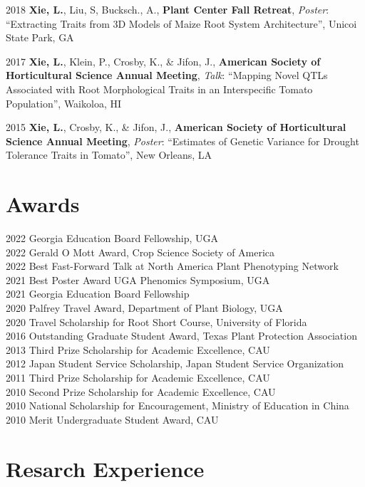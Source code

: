 \documentclass[11pt,a4paper,]{awesome-cv}
\begin{document}
2018 \textbf{Xie, L.}, Liu, S, Bucksch., A., \textbf{Plant Center Fall
Retreat}, \emph{Poster}: ``Extracting Traits from 3D Models of Maize
Root System Architecture'', Unicoi State Park, GA

2017 \textbf{Xie, L.}, Klein, P., Crosby, K., \& Jifon, J.,
\textbf{American Society of Horticultural Science Annual Meeting},
\emph{Talk}: ``Mapping Novel QTLs Associated with Root Morphological
Traits in an Interspecific Tomato Population'', Waikoloa, HI

2015 \textbf{Xie, L.}, Crosby, K., \& Jifon, J., \textbf{American
Society of Horticultural Science Annual Meeting}, \emph{Poster}:
``Estimates of Genetic Variance for Drought Tolerance Traits in
Tomato'', New Orleans, LA

\hypertarget{awards}{%
\section{Awards}\label{awards}}

2022 Georgia Education Board Fellowship, UGA\\
2022 Gerald O Mott Award, Crop Science Society of America\\
2022 Best Fast-Forward Talk at North America Plant Phenotyping Network\\
2021 Best Poster Award UGA Phenomics Symposium, UGA\\
2021 Georgia Education Board Fellowship\\
2020 Palfrey Travel Award, Department of Plant Biology, UGA\\
2020 Travel Scholarship for Root Short Course, University of Florida\\
2016 Outstanding Graduate Student Award, Texas Plant Protection
Association\\
2013 Third Prize Scholarship for Academic Excellence, CAU\\
2012 Japan Student Service Scholarship, Japan Student Service
Organization\\
2011 Third Prize Scholarship for Academic Excellence, CAU\\
2010 Second Prize Scholarship for Academic Excellence, CAU\\
2010 National Scholarship for Encouragement, Ministry of Education in
China\\
2010 Merit Undergraduate Student Award, CAU

\hypertarget{resarch-experience}{%
\section{Resarch Experience}\label{resarch-experience}}
\end{document}

